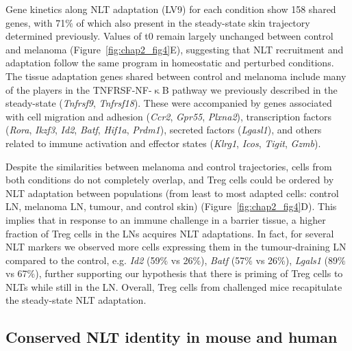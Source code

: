 Gene kinetics along NLT adaptation (LV9) for each condition show 158 shared genes, with 71${\%}$ of which also present in the steady-state skin trajectory determined previously. Values of t0 remain largely unchanged between control and melanoma (Figure~\ref{fig:chap2_fig4}E), suggesting that NLT recruitment and adaptation follow the same program in homeostatic and perturbed conditions. The tissue adaptation genes shared between control and melanoma include many of the players in the TNFRSF-NF-${\upkappa}$B pathway we previously described in the steady-state (\textit{Tnfrsf9}, \textit{Tnfrsf18}). These were accompanied by genes associated with cell migration and adhesion (\textit{Ccr2}, \textit{Gpr55}, \textit{Plxna2}), transcription factors (\textit{Rora}, \textit{Ikzf3}, \textit{Id2}, \textit{Batf}, \textit{Hif1a}, \textit{Prdm1}), secreted factors (\textit{Lgasl1}), and others related to immune activation and effector states (\textit{Klrg1}, \textit{Icos}, \textit{Tigit}, \textit{Gzmb}).

Despite the similarities between melanoma and control trajectories, cells from both conditions do not completely overlap, and Treg cells could be ordered by NLT adaptation between populations (from least to most adapted cells: control LN, melanoma LN, tumour, and control skin) (Figure~\ref{fig:chap2_fig4}D). This implies that in response to an immune challenge in a barrier tissue, a higher fraction of Treg cells in the LNs acquires NLT adaptations. In fact, for several NLT markers we observed more cells expressing them in the tumour-draining LN compared to the control, e.g. \textit{Id2} (59${\%}$ vs 26${\%}$), \textit{Batf} (57${\%}$ vs 26${\%}$), \textit{Lgals1} (89${\%}$ vs 67${\%}$), further supporting our hypothesis that there is priming of Treg cells to NLTs while still in the LN. Overall, Treg cells from challenged mice recapitulate the steady-state NLT adaptation.



\subsection{Conserved NLT identity in mouse and human}
\label{section2.2.5}

